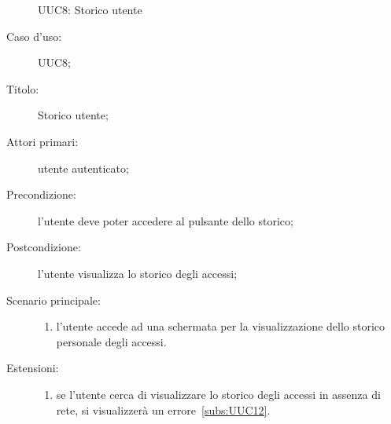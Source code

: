 \documentclass[../../../analisi-dei-requisiti.tex]{subfiles}
\begin{document}
\begin{figure}[H]
  \centering
  \caption{UUC8: Storico utente}%
  \label{fig:uuc8}
\end{figure}

\begin{description}
  \item[Caso d’uso:] UUC8;
  \item[Titolo:] Storico utente;
  \item[Attori primari:] utente autenticato;
  \item[Precondizione:]  l'utente deve poter accedere al pulsante dello storico;
  \item[Postcondizione:] l'utente visualizza lo storico degli accessi;
  \item[Scenario principale:]
        \begin{enumerate}
          \item l'utente accede ad una schermata per la visualizzazione dello storico personale degli accessi.
        \end{enumerate}
  \item[Estensioni:]
        \begin{enumerate}
          \item se l'utente cerca di visualizzare lo storico degli accessi in assenza di rete, si visualizzerà un errore~\ref{subs:UUC12}.
        \end{enumerate}
\end{description}
\end{document}
